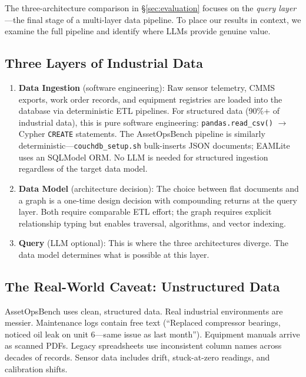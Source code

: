 \documentclass[11pt]{article}
\begin{document}
The three-architecture comparison in \S\ref{sec:evaluation} focuses on the \emph{query layer}---the final stage of a multi-layer data pipeline. To place our results in context, we examine the full pipeline and identify where LLMs provide genuine value.

\subsection{Three Layers of Industrial Data}

\begin{enumerate}[leftmargin=*]
  \item \textbf{Data Ingestion} (software engineering): Raw sensor telemetry, CMMS exports, work order records, and equipment registries are loaded into the database via deterministic ETL pipelines. For structured data (90\%+ of industrial data), this is pure software engineering: \texttt{pandas.read\_csv()} $\to$ Cypher \texttt{CREATE} statements. The AssetOpsBench pipeline is similarly deterministic---\texttt{couchdb\_setup.sh} bulk-inserts JSON documents; EAMLite uses an SQLModel ORM. No LLM is needed for structured ingestion regardless of the target data model.

  \item \textbf{Data Model} (architecture decision): The choice between flat documents and a graph is a one-time design decision with compounding returns at the query layer. Both require comparable ETL effort; the graph requires explicit relationship typing but enables traversal, algorithms, and vector indexing.

  \item \textbf{Query} (LLM optional): This is where the three architectures diverge. The data model determines what is possible at this layer.
\end{enumerate}

\subsection{The Real-World Caveat: Unstructured Data}
\label{sec:real-world}

AssetOpsBench uses clean, structured data. Real industrial environments are messier. Maintenance logs contain free text (``Replaced compressor bearings, noticed oil leak on unit 6---same issue as last month''). Equipment manuals arrive as scanned PDFs. Legacy spreadsheets use inconsistent column names across decades of records. Sensor data includes drift, stuck-at-zero readings, and calibration shifts.
\end{document}
